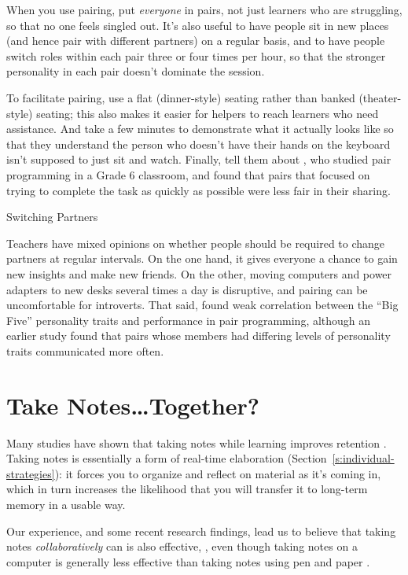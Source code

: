 When you use pairing, put \emph{everyone} in pairs, not just learners who are
struggling, so that no one feels singled out. It's also useful to have
people sit in new places (and hence pair with different partners) on a
regular basis, and to have people switch roles within each pair three or
four times per hour, so that the stronger personality in each pair
doesn't dominate the session.

To facilitate pairing, use a flat (dinner-style) seating rather than
banked (theater-style) seating; this also makes it easier for helpers to
reach learners who need assistance. And take a few minutes to
demonstrate what it actually looks like so that they understand the
person who doesn't have their hands on the keyboard isn't supposed to
just sit and watch. Finally, tell them about \cite{Lewi2015}, who
studied pair programming in a Grade 6 classroom, and found that pairs
that focused on trying to complete the task as quickly as possible were
less fair in their sharing.

\begin{aside}{Switching Partners}

Teachers have mixed opinions on whether people should be required to
change partners at regular intervals. On the one hand, it gives
everyone a chance to gain new insights and make new friends. On the
other, moving computers and power adapters to new desks several times
a day is disruptive, and pairing can be uncomfortable for introverts.
That said, \cite{Hann2010} found weak correlation between the ``Big
Five'' personality traits and performance in pair programming, although
an earlier study \cite{Wall2009} found that pairs whose members had
differing levels of personality traits communicated more often.

\end{aside}

\section{Take Notes\ldots{}Together?}\label{s:classroom-notetaking}

Many studies have shown that taking notes while learning improves
retention \cite{Aike1975,Boha2011}. Taking notes is essentially a
form of real-time elaboration (Section~\ref{s:individual-strategies}): it
forces you to organize and reflect on material as it's coming in, which
in turn increases the likelihood that you will transfer it to long-term
memory in a usable way.

Our experience, and some recent research findings, lead us to believe
that taking notes \emph{collaboratively} can is also effective,
\cite{Ornd2015,Yang2015}, even though taking notes on a
computer is generally less effective than taking notes using pen and
paper \cite{Muel2014}.

